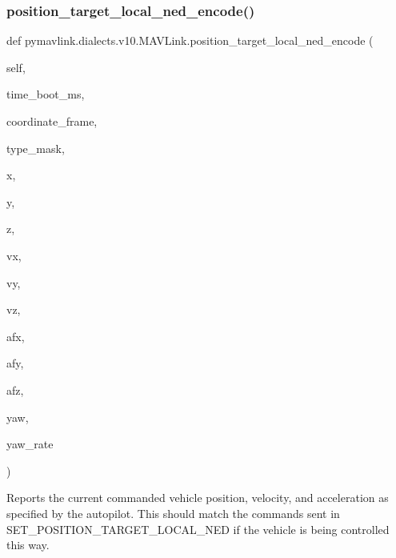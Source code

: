 \begin{DoxyVerb}
\begin{DoxyVerb}
\begin{DoxyVerb}
\begin{DoxyVerb}
\subsubsection{\texorpdfstring{position\+\_\+target\+\_\+local\+\_\+ned\+\_\+encode()}{position\_target\_local\_ned\_encode()}}
{\footnotesize\ttfamily def pymavlink.\+dialects.\+v10.\+M\+A\+V\+Link.\+position\+\_\+target\+\_\+local\+\_\+ned\+\_\+encode (\begin{DoxyParamCaption}\item[{}]{self,  }\item[{}]{time\+\_\+boot\+\_\+ms,  }\item[{}]{coordinate\+\_\+frame,  }\item[{}]{type\+\_\+mask,  }\item[{}]{x,  }\item[{}]{y,  }\item[{}]{z,  }\item[{}]{vx,  }\item[{}]{vy,  }\item[{}]{vz,  }\item[{}]{afx,  }\item[{}]{afy,  }\item[{}]{afz,  }\item[{}]{yaw,  }\item[{}]{yaw\+\_\+rate }\end{DoxyParamCaption})}

\begin{DoxyVerb}Reports the current commanded vehicle position, velocity, and
acceleration as specified by the autopilot. This
should match the commands sent in
SET_POSITION_TARGET_LOCAL_NED if the vehicle is being
controlled this way.


\end{DoxyVerb}
\end{DoxyVerb}
\end{DoxyVerb}
\end{DoxyVerb}
\end{DoxyVerb}
